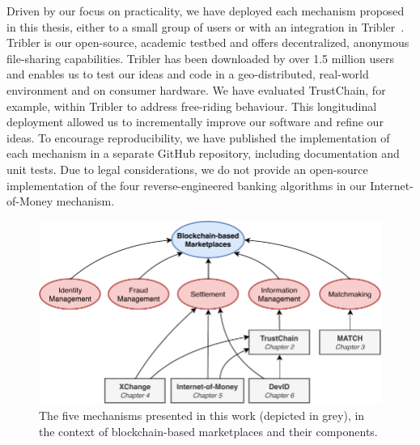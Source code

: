 Driven by our focus on practicality, we have deployed each mechanism proposed in this thesis, either to a small group of users or with an integration in Tribler~\cite{zeilemaker2011tribler}.
Tribler is our open-source, academic testbed and offers decentralized, anonymous file-sharing capabilities.
Tribler has been downloaded by over 1.5 million users and enables us to test our ideas and code in a geo-distributed, real-world environment and on consumer hardware.
We have evaluated TrustChain, for example, within Tribler to address free-riding behaviour.
This longitudinal deployment allowed us to incrementally improve our software and refine our ideas.
To encourage reproducibility, we have published the implementation of each mechanism in a separate GitHub repository, including documentation and unit tests.
Due to legal considerations, we do not provide an open-source implementation of the four reverse-engineered banking algorithms in our Internet-of-Money mechanism.






\begin{figure}[t]
	\centering
	\includegraphics[width=\linewidth]{introduction/assets/thesis_overview}
	\caption{The five mechanisms presented in this work (depicted in grey), in the context of blockchain-based marketplaces and their components.}
	\label{fig:thesis_overview}
\end{figure}


